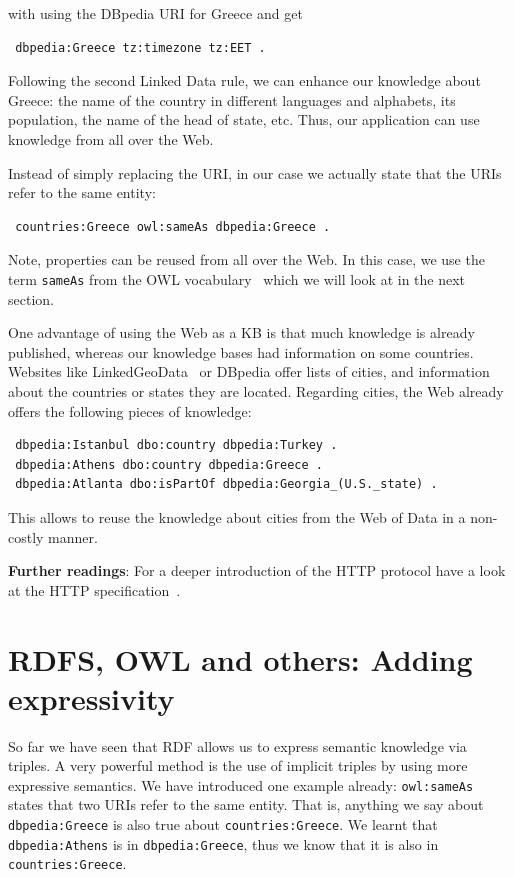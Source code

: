 with using the DBpedia URI for Greece and get

\begin{verbatim}
 dbpedia:Greece tz:timezone tz:EET .
\end{verbatim}

Following the second Linked Data rule, we can enhance our knowledge about Greece: the name of the country in different languages and alphabets, its population, the name of the head of state, etc.
Thus, our application can use knowledge from all over the Web.

Instead of simply replacing the URI, in our case we actually state that the URIs refer to the same entity:

\begin{verbatim}
 countries:Greece owl:sameAs dbpedia:Greece .
\end{verbatim}

Note, properties can be reused from all over the Web.
In this case, we use the term \texttt{sameAs} from the OWL vocabulary~\cite{owl} which we will look at in the next section.

One advantage of using the Web as a \ac{KB} is that much knowledge is already published,
whereas our knowledge bases had information on some countries.
Websites like LinkedGeoData~\cite{linkedgeodata} or DBpedia offer lists of cities, and information about the countries or states they are located.
Regarding cities, the Web already offers the following pieces of knowledge:

\begin{verbatim}
 dbpedia:Istanbul dbo:country dbpedia:Turkey .
 dbpedia:Athens dbo:country dbpedia:Greece .
 dbpedia:Atlanta dbo:isPartOf dbpedia:Georgia_(U.S._state) .
\end{verbatim}

This allows to reuse the knowledge about cities from the Web of Data in a non-costly manner.

\medskip

\textbf{Further readings}:
For a deeper introduction of the HTTP protocol have a look at the HTTP specification~\cite{http}.

\section{RDFS, OWL and others: Adding expressivity}
\label{rdfs}

So far we have seen that \ac{RDF} allows us to express semantic knowledge via triples.
A very powerful method is the use of implicit triples by using more expressive semantics.
We have introduced one example already: \texttt{owl:sameAs} states that two URIs refer to the same entity.
That is, anything we say about \texttt{dbpedia:Greece} is also true about \texttt{countries:Greece}.
We learnt that \texttt{dbpedia:Athens} is in \texttt{dbpedia:Greece}, thus we know that it is also in \texttt{countries:Greece}.

